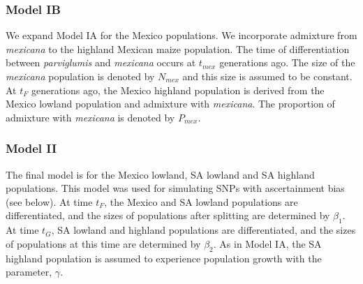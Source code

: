 \subsubsection{Model IB}
We expand Model IA for the Mexico populations.  We incorporate admixture from \emph{mexicana} to the highland Mexican maize population.  The time of differentiation between \emph{parviglumis} and \emph{mexicana} occurs at $t_{mex}$ generations ago.  The size of the \emph{mexicana} population is denoted by $N_{mex}$ and this size is assumed to be constant.  At $t_F$ generations ago, the Mexico highland population is derived from the Mexico lowland population and admixture with \emph{mexicana}.  The proportion of admixture with \emph{mexicana} is denoted by $P_{mex}$.  \\

\subsubsection{Model II}
The final model is for the Mexico lowland, SA lowland and SA highland populations.  This model was used for simulating SNPs with ascertainment bias (see below).  At time $t_F$, the Mexico and SA lowland populations are differentiated, and the sizes of populations after splitting are determined by $\beta_1$.  At time $t_G$, SA lowland and highland populations are differentiated, and the sizes of populations at this time are determined by $\beta_2$.  As in Model IA, the SA highland population is assumed to experience population growth with the parameter, $\gamma$.\\


